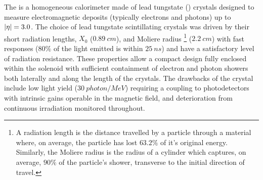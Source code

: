 The \ECAL is a homogeneous calorimeter made of lead tungstate (\pbwo) crystals designed to measure electromagnetic deposits (typically electrons and photons) up to ${|\eta|=3.0}$. The choice of lead tungstate scintillating crystals was driven by their short radiation lengths, $X_0$ (${\SI{0.89}{cm}}$), and Moliere radius \footnote{A radiation length is the distance travelled by a particle through a material where, on average, the particle has lost $63.2\%$ of it's original energy. Similarly, the Moliere radius is the radius of a cylinder which captures, on average, $90\%$ of the particle's shower, transverse to the initial direction of travel.} (${\SI{2.2}{cm}}$) with fast responses ($80\%$ of the light emitted is within ${\SI{25}{ns}}$) and have a satisfactory level of radiation resistance. These properties allow a compact design fully enclosed within the solenoid with sufficient containment of electron and photon showers both laterally and along the length of the crystals. The drawbacks of the crystal include low light yield (${\SI{30}{photon/MeV}}$) requiring a coupling to photodetectors with intrinsic gains operable in the magnetic field, and deterioration from continuous irradiation monitored throughout.

